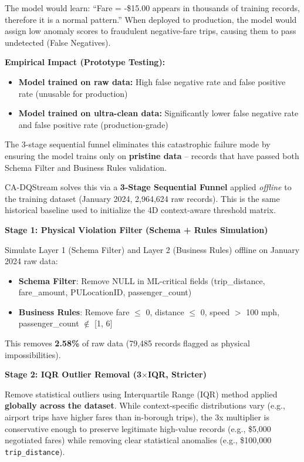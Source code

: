 The model would learn: ``Fare = -\$15.00 appears in thousands of training records, therefore it is a normal pattern.'' When deployed to production, the model would assign low anomaly scores to fraudulent negative-fare trips, causing them to pass undetected (False Negatives).

\textbf{Empirical Impact (Prototype Testing):}
\begin{itemize}
    \item \textbf{Model trained on raw data:} High false negative rate and false positive rate (unusable for production)
    \item \textbf{Model trained on ultra-clean data:} Significantly lower false negative rate and false positive rate (production-grade)
\end{itemize}

The 3-stage sequential funnel eliminates this catastrophic failure mode by ensuring the model trains only on \textbf{pristine data} -- records that have passed both Schema Filter and Business Rules validation.

CA-DQStream solves this via a \textbf{3-Stage Sequential Funnel} applied \emph{offline} to the training dataset (January 2024, 2,964,624 raw records). This is the same historical baseline used to initialize the 4D context-aware threshold matrix.

\textbf{Stage 1: Physical Violation Filter (Schema + Rules Simulation)}

Simulate Layer 1 (Schema Filter) and Layer 2 (Business Rules) offline on January 2024 raw data:

\begin{itemize}
    \item \textbf{Schema Filter}: Remove NULL in ML-critical fields (trip\_distance, fare\_amount, PULocationID, passenger\_count)
    \item \textbf{Business Rules}: Remove fare $\leq$ 0, distance $\leq$ 0, speed $>$ 100 mph, passenger\_count $\notin$ [1, 6]
\end{itemize}

This removes \textbf{2.58\%} of raw data (79,485 records flagged as physical impossibilities).

\textbf{Stage 2: IQR Outlier Removal (3$\times$IQR, Stricter)}

Remove statistical outliers using Interquartile Range (IQR) method applied \textbf{globally across the dataset}. While context-specific distributions vary (e.g., airport trips have higher fares than in-borough trips), the 3x multiplier is conservative enough to preserve legitimate high-value records (e.g., \$5,000 negotiated fares) while removing clear statistical anomalies (e.g., \$100,000 \texttt{trip\_distance}).

